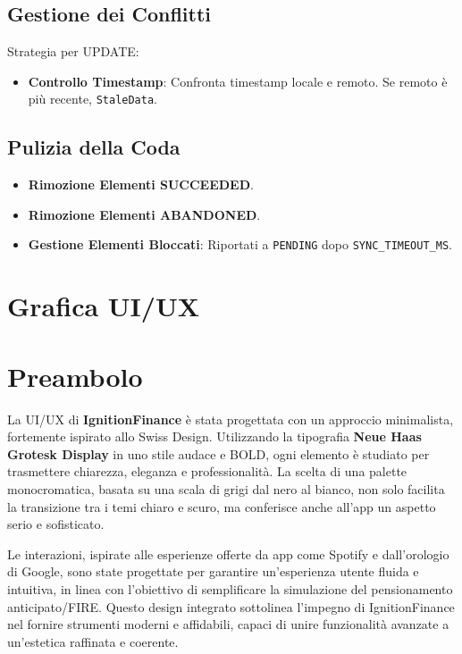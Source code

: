 \documentclass{article}
\begin{document}
\subsection{Gestione dei Conflitti}\label{subsec:gestione-dei-conflitti}
Strategia per UPDATE:
\begin{itemize}
    \item \textbf{Controllo Timestamp}: Confronta timestamp locale e remoto.
    Se
    remoto è più recente, \texttt{StaleData}.
\end{itemize}

\subsection{Pulizia della Coda}\label{subsec:pulizia-della-coda}
\begin{itemize}
    \item \textbf{Rimozione Elementi SUCCEEDED}.
    \item \textbf{Rimozione Elementi ABANDONED}.
    \item \textbf{Gestione Elementi Bloccati}: Riportati a \texttt{PENDING} dopo
    \texttt{SYNC\_TIMEOUT\_MS}.
\end{itemize}
\vspace{0.5cm}

\section*{Grafica UI/UX}
\section{Preambolo}\label{sec:preambolo4}

La UI/UX di \textbf{IgnitionFinance} è stata progettata con un approccio
minimalista, fortemente ispirato allo Swiss Design.
Utilizzando la tipografia
\textbf{Neue Haas Grotesk Display} in uno stile audace e BOLD, ogni elemento è
studiato per trasmettere chiarezza, eleganza e professionalità.
La scelta di una
palette monocromatica, basata su una scala di grigi dal nero al bianco, non solo
facilita la transizione tra i temi chiaro e scuro, ma conferisce anche all'app
un aspetto serio e sofisticato.

\vspace{\baselineskip}

\noindent Le interazioni, ispirate alle esperienze offerte da app come Spotify e
dall'orologio di Google, sono state progettate per garantire un'esperienza
utente fluida e intuitiva, in linea con l'obiettivo di semplificare la
simulazione del pensionamento anticipato/FIRE. Questo design integrato
sottolinea l'impegno di IgnitionFinance nel fornire strumenti moderni e
affidabili, capaci di unire funzionalità avanzate a un'estetica raffinata e
coerente.
\end{document}

